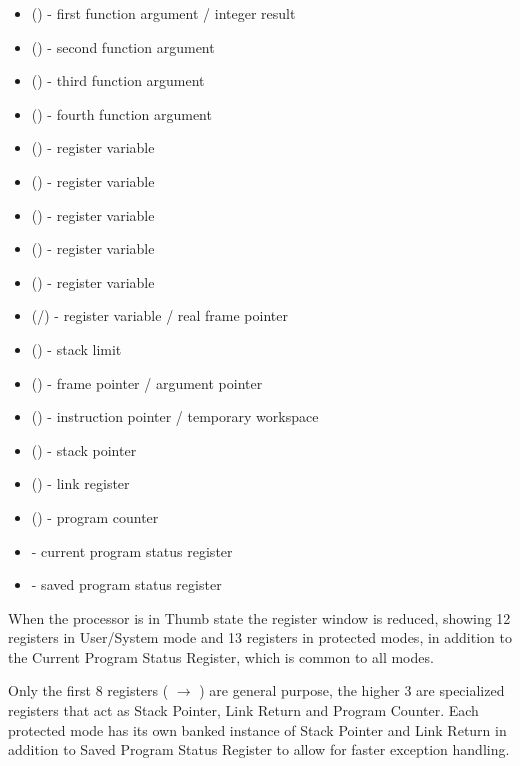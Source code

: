 \begin{itemize}
	\item {} () - first function argument / integer result
	\item {} () - second function argument
	\item {} () - third function argument
	\item {} () - fourth function argument
	\item {} () - register variable
	\item {} () - register variable
	\item {} () - register variable
	\item {} () - register variable
	\item {} () - register variable
	\item {} (/) - register variable / real frame pointer
	\item {} () - stack limit
	\item {} () - frame pointer / argument pointer
	\item {} () - instruction pointer / temporary workspace
	\item {} () - stack pointer
	\item {} () - link register
	\item {} () - program counter
	\item {} - current program status register
	\item {} - saved program status register
\end{itemize}

When the processor is in Thumb state the register window is reduced, showing 12 registers in User/System mode and 13 registers in protected modes, in addition to the Current Program Status Register, which is common to all modes. 

Only the first 8 registers ( $\rightarrow$ ) are general purpose, the higher 3 are specialized registers that act as Stack Pointer, Link Return and Program Counter. Each protected mode has its own banked instance of Stack Pointer and Link Return in addition to Saved Program Status Register to allow for faster exception handling. 


